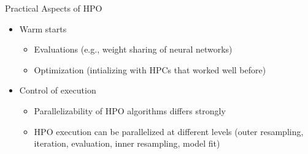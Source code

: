 \begin{vbframe}{Practical Aspects of HPO}
\begin{itemize}
    \item Warm starts
    \begin{itemize}
        \item Evaluations (e.g., weight sharing of neural networks)
        \item Optimization (intializing with HPCs that worked well before)
    \end{itemize}
    \item Control of execution
    \begin{itemize}
        \item Parallelizability of HPO algorithms differs strongly 
        \item  HPO execution can be parallelized at different levels (outer resampling, iteration, evaluation, inner resampling, model fit)
    \end{itemize}
\end{itemize}
\end{vbframe}


\endlecture

